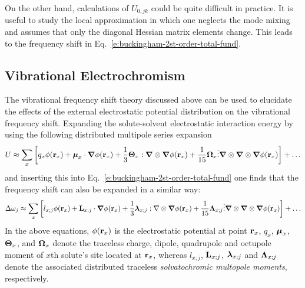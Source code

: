 \documentclass[a4paper,titlepage,twoside,fleqn,12pt]{book}
\newcommand{\BM}[1]{\ensuremath{\mbox{\boldmath${#1}$}}}
\begin{document}
\begin{refsection}
On the other hand, calculations of $U_{0,jk}$ could be quite difficult 
in practice. It is useful to study the local approximation in which
one neglects the mode mixing and assumes that only the diagonal Hessian
matrix elements change. This leads to the frequency shift in Eq.~\eqref{e:buckingham-2st-order-total-fund}.

\subsection{Vibrational Electrochromism}

The vibrational frequency shift theory discussed above 
can be used
to elucidate the effects of the external electrostatic 
potential distribution on the vibrational frequency shift.
Expanding the solute-solvent electrostatic interaction energy by using the
following distributed multipole series 
expansion\citep{Stone.TheTheoryOfIntermolecularForces.1996}
%
\begin{equation} \label{e:dmtp}
 U \approx  \sum_x \left[ q_x \phi({\bf r}_x) + 
                  {\BM \mu}_x \cdot {\BM \nabla} \phi({\bf r}_x)   + 
      \frac{1}{3} {\BM \Theta}_x : {\BM \nabla} \otimes {\BM \nabla} \phi({\bf r}_x)   + 
     \frac{1}{15} {\BM \Omega}_x \vdots {\BM \nabla} \otimes {\BM \nabla} \otimes {\BM \nabla} \phi({\bf r}_x) \right] + \ldots
\end{equation}
%
and inserting this into Eq.~\eqref{e:buckingham-2st-order-total-fund} 
one finds that the frequency shift can also be expanded
in a similar way\citep{Cho.JCP.2009}:
%
\begin{equation} \label{e:dmtp-sol}
 \Delta\omega_j \approx  \sum_x \left[ l_{x;j} \phi({\bf r}_x) + 
                        {\bf L}_{x;j} \cdot {\BM \nabla} \phi({\bf r}_x)   + 
      \frac{1}{3} {\BM \lambda}_{x;j} : {\bf \nabla} \otimes {\BM \nabla} \phi({\bf r}_x)   + 
     \frac{1}{15} {\BM \Lambda}_{x;j} \vdots {\BM \nabla} \otimes {\BM \nabla} \otimes {\BM \nabla} \phi({\bf r}_x) \right] + \ldots
\end{equation}
%
In the above equations, $\phi({\bf r}_x)$ is the electrostatic
potential at point ${\bf r}_x$,
$q_x$, ${\BM \mu}_x$, ${\BM \Theta}_x$, and ${\BM \Omega}_x$ 
denote the traceless charge, dipole, quadrupole and octupole moment 
of $x$th solute's site located at ${\bf r}_x$, whereas 
$l_{x;j}$, ${\bf L}_{x;j}$, ${\BM \lambda}_{x;j}$ and ${\BM \Lambda}_{x;j}$ 
denote the associated distributed traceless
\emph{solvatochromic multopole moments}, respectively.


\end{refsection}
\end{document}
